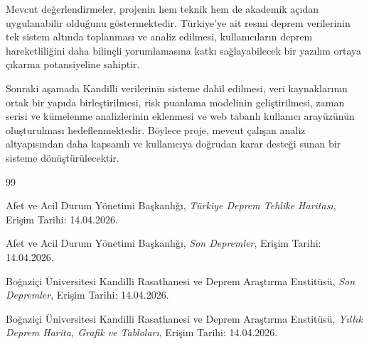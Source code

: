 \documentclass[12pt,a4paper]{report}
\begin{document}
Mevcut değerlendirmeler, projenin hem teknik hem de akademik açıdan uygulanabilir
olduğunu göstermektedir. Türkiye'ye ait resmi deprem verilerinin tek sistem altında
toplanması ve analiz edilmesi, kullanıcıların deprem hareketliliğini daha bilinçli
yorumlamasına katkı sağlayabilecek bir yazılım ortaya çıkarma potansiyeline sahiptir.

Sonraki aşamada Kandilli verilerinin sisteme dahil edilmesi, veri kaynaklarının ortak
bir yapıda birleştirilmesi, risk puanlama modelinin geliştirilmesi, zaman serisi ve
kümelenme analizlerinin eklenmesi ve web tabanlı kullanıcı arayüzünün oluşturulması
hedeflenmektedir. Böylece proje, mevcut çalışan analiz altyapısından daha kapsamlı ve
kullanıcıya doğrudan karar desteği sunan bir sisteme dönüştürülecektir.

\begin{thebibliography}{99}

Afet ve Acil Durum Yönetimi Başkanlığı,
\textit{Türkiye Deprem Tehlike Haritası},
Erişim Tarihi: 14.04.2026.

Afet ve Acil Durum Yönetimi Başkanlığı,
\textit{Son Depremler},
Erişim Tarihi: 14.04.2026.

Boğaziçi Üniversitesi Kandilli Rasathanesi ve Deprem Araştırma Enstitüsü,
\textit{Son Depremler},
Erişim Tarihi: 14.04.2026.

Boğaziçi Üniversitesi Kandilli Rasathanesi ve Deprem Araştırma Enstitüsü,
\textit{Yıllık Deprem Harita, Grafik ve Tabloları},
Erişim Tarihi: 14.04.2026.

\end{thebibliography}
\end{document}
